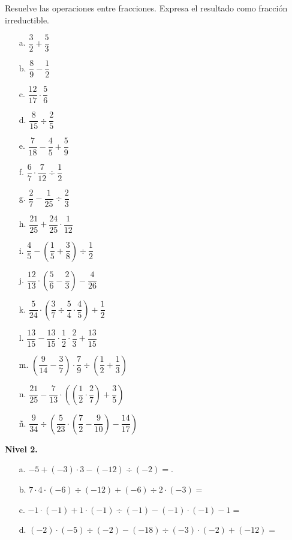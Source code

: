 \documentclass[spanish,letterpaper, 11pt, addpoints, answers]{exam}
\begin{document}
\begin{questions}
  \question Resuelve las operaciones entre fracciones. Expresa el resultado como fracción irreductible.
  
  \begin{itemize}
    \item[a.] $\dfrac{3}{2}+\dfrac{5}{3}$
  \item[b.] $\dfrac{8}{9}-\dfrac{1}{2}$
  \item[c.] $\dfrac{12}{17}\cdot \dfrac{5}{6}$
  \item[d.] $\dfrac{8}{15}\div \dfrac{2}{5}$
  \item[e.] $\dfrac{7}{18}-\dfrac{4}{5}+\dfrac{5}{9}$
  \item[f.] $\dfrac{6}{7}\cdot\dfrac{7}{12}\div \dfrac{1}{2}$
  \item[g.] $\dfrac{2}{7}-\dfrac{1}{25}\div \dfrac{2}{3}$
  \item[h.] $\dfrac{21}{25}+\dfrac{24}{25}\cdot \dfrac{1}{12}$
  \item[i.] $\dfrac{4}{5}-\left(\dfrac{1}{5}+\dfrac{3}{8}\right)\div \dfrac{1}{2}$
  \item[j.] $\dfrac{12}{13}\cdot \left(\dfrac{5}{6}-\dfrac{2}{3}\right)-\dfrac{4}{26}$
  \item[k.] $\dfrac{5}{24}\cdot \left(\dfrac{3}{7}\div \dfrac{5}{4}\cdot \dfrac{4}{5}\right)+\dfrac{1}{2}$
  \item[l.] $\dfrac{13}{15}-\dfrac{13}{15}\cdot \dfrac{1}{2}\cdot \dfrac{2}{3}+\dfrac{13}{15}$
  \item[m.] $\left(\dfrac{9}{14}-\dfrac{3}{7}\right)\cdot \dfrac{7}{9}\div \left(\dfrac{1}{2}+\dfrac{1}{3}\right)$
  \item[n.] $\dfrac{21}{25}-\dfrac{7}{13}\cdot \left(\left(\dfrac{1}{2}\cdot \dfrac{2}{7}\right)+\dfrac{3}{5}\right)$
  \item[ñ.] $\dfrac{9}{34}\div \left(\dfrac{5}{23}\cdot \left(\dfrac{7}{2}-\dfrac{9}{10}\right)-\dfrac{14}{17}\right)$  
  \end{itemize}
  
  \textbf{Nivel 2.}
  \begin{itemize}
  \item[a.] $-5+(-3)\cdot 3-(-12)\div (-2)=$.
  
  \item[b.] $7\cdot 4\cdot (-6)\div (-12)+(-6)\div 2\cdot (-3)=$
  
  \item[c.] $-1\cdot (-1)+1\cdot (-1)\div (-1)-(-1)\cdot (-1)-1=$
  
  \item[d.] $(-2)\cdot (-5)\div (-2)-(-18)\div(-3)\cdot (-2)+(-12)=$
  

\end{itemize}
\end{questions}
\end{document}
